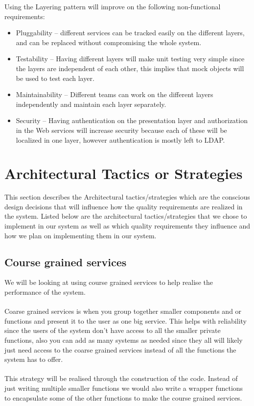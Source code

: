 \documentclass[a4paper]{article}
\begin{document}
Using the Layering pattern will improve on the following non-functional requirements:
\begin{itemize}
			\item Pluggability – different services can be tracked easily on the different layers, and can be replaced without compromising the whole system.
			\item Testability – Having different layers will make unit testing very simple since the layers are independent of each other, this implies that mock objects will be used to test each layer.
			\item Maintainability – Different teams can work on the different layers independently and maintain each layer separately.
			\item Security – Having authentication on the presentation layer and authorization in the Web services will increase security because each of these will be localized in one layer, however authentication is mostly left to LDAP.   \\[1em]
\end{itemize}


\section{Architectural Tactics or Strategies}
This section describes the Architectural tactics/strategies which are the conscious design decisions that will influence how the quality requirements are realized in the system. Listed below are the architectural tactics/strategies that we chose to implement in our system as well as which quality requirements they influence and how we plan on implementing them in our system. 

\subsection{Course grained services}
We will be looking at using course grained services to help realise the performance of the system. 
\\
\\Coarse grained services is when you group together smaller components and or functions and present it to the user as one big service. This helps with reliability since the users of the system don’t have access to all the smaller private functions, also you can add as many systems as needed since they all will likely just need access to the coarse grained services instead of all the functions the system has to offer.
\\
\\This strategy will be realised through the construction of the code. Instead of just writing multiple smaller functions we would also write a wrapper functions to encapsulate some of the other functions to make the course grained services. 
\\
\end{document}
